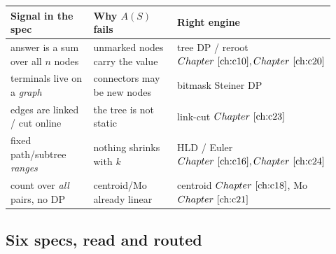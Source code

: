 \begin{comparisonbox}
\setlength{\tabcolsep}{3pt}\renewcommand{\arraystretch}{1.2}%
\begin{tabular}{@{}p{0.30\linewidth}p{0.31\linewidth}p{0.31\linewidth}@{}}
\toprule
\textbf{Signal in the spec} & \textbf{Why \(A(S)\) fails} & \textbf{Right engine}\\
\midrule
answer is a sum over all \(n\) nodes & unmarked nodes carry the value & tree DP / reroot \(\chref{c10},\chref{c20}\)\\
terminals live on a \emph{graph} & connectors may be new nodes & bitmask Steiner DP\\
edges are linked / cut online & the tree is not static & link-cut \(\chref{c23}\)\\
fixed path/subtree \emph{ranges} & nothing shrinks with \(k\) & HLD / Euler \(\chref{c16},\chref{c24}\)\\
count over \emph{all} pairs, no DP & centroid/Mo already linear & centroid \(\chref{c18}\), Mo \(\chref{c21}\)\\
\bottomrule
\end{tabular}
\end{comparisonbox}

\subsection*{Six specs, read and routed}

